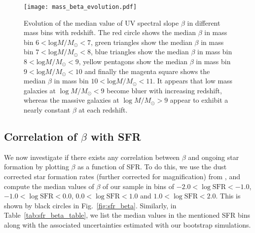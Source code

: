 \documentclass[twocolumn]{aastex63}
\begin{document}
\begin{figure}
\texttt{[image: mass\_beta\_evolution.pdf]}
\caption{Evolution of the median value of UV spectral slope $\beta$ in different mass bins with redshift. The red circle shows the median $\beta$ in mass bin $6<\mathrm{log}M/M_{\odot}<7$, green triangles show the median $\beta$ in mass bin $7<\mathrm{log}M/M_{\odot}<8$, blue triangles show the median $\beta$ in mass bin $8<\mathrm{log}M/M_{\odot}<9$, yellow pentagons show the median $\beta$ in mass bin $9<\mathrm{log}M/M_{\odot}<10$ and finally the magenta square shows the median $\beta$ in mass bin $10<\mathrm{log}M/M_{\odot}<11$. It appears that low mass galaxies at $\log M/M_{\odot}<9$ become bluer with increasing redshift, whereas the massive galaxies at $\log M/M_{\odot}>9$ appear to exhibit a nearly constant $\beta$ at each redshift.  }
\label{fig:mass_beta_evolution}
\end{figure}

\subsection{Correlation of $\beta$ with SFR}
\label{sec:betasfr}
We now investigate if there exists any correlation between $\beta$ and ongoing star formation by plotting $\beta$ as a function of SFR. To do this, we use the dust corrected star formation rates (further corrected for magnification) from \citet{Bhatawdekar2019}, and compute the median values of $\beta$ of our sample in bins of $-2.0<\log\mathrm{SFR}<-1.0$, $-1.0<\log\mathrm{SFR}<0.0$, $0.0<\log\mathrm{SFR}<1.0$ and  $1.0<\log\mathrm{SFR}<2.0$. This is shown by black circles in Fig.~\ref{fig:sfr_beta}. Similarly, in Table~\ref{tab:sfr_beta_table}, we list the median values in the mentioned SFR bins along with the associated uncertainties estimated with our bootstrap simulations.
\end{document}
